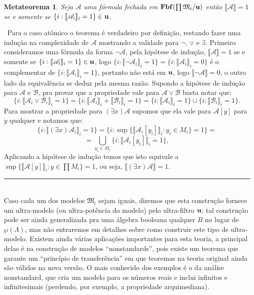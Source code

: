 \documentclass[11pt,a4paper]{article}
\newtheorem{mthrm}[mydef]{Metateorema}
\def\dem{\par\smallbreak\noindent {\textit{ Demonstração:}} \ }
\def\eop{\hfill\rule{2.5mm}{2.5mm} \\ }
\theoremstyle{definition}
\begin{document}
\begin{mthrm}
	
	Seja $\mathscr{A}$ uma fórmula fechada em $\textrm{\textbf{Fbf}}(\prod \mathfrak{M}_i/\bf{u})$ então $ \llbracket \mathscr{A} \rrbracket=1$ se e somente se $\{i: \llbracket \mathscr{A}_i \rrbracket_i=1\}\in \bf{u}$.
	
\end{mthrm}

\dem Para o caso atômico o teorema é verdadeiro por definição, restando fazer uma indução na complexidade de $\mathscr{A}$ mostrando a validade para $\neg$, $\vee$ e $\exists$. Primeiro consideramos uma fórmula da forma $\neg \mathscr{A}$, pela hipótese de indução, $ \llbracket \mathscr{A} \rrbracket=1$ se e somente se $\{i: \llbracket \mathscr{A}_i \rrbracket_i=1\}\in \bf{u}$, logo $\{i: \llbracket \neg \mathscr{A}_i \rrbracket_i=1\}=\{i: \llbracket \mathscr{A}_i \rrbracket_i=0\}$ é o complementar de  $\{i: \llbracket \mathscr{A}_i \rrbracket_i=1\}$, portanto não está em  $\bf{u}$, logo $ \llbracket \neg \mathscr{A} \rrbracket=0$, o outro lado da equivalência se deduz pela mesma razão. Supondo a hipótese de indução para $ \mathscr{A}$ e $ \mathscr{B}$, pra provar que a propriedade vale para $\mathscr{A} \vee \mathscr{B}$ basta notar que: $$\{i: \llbracket \mathscr{A}_i \vee \mathscr{B}_i \rrbracket_i=1\}=\{i: \llbracket \mathscr{A}_i \rrbracket_i + \llbracket \mathscr{B}_i \rrbracket_i=1\}=\{i: \llbracket \mathscr{A}_i \rrbracket_i =1\} \cup  \{ i: \llbracket \mathscr{B}_i \rrbracket_i=1\}.$$ Para mostrar a propriedade para $(\exists x)\mathscr{A}$ supomos que ela vale para $\mathscr{A}[y]$ para $y$ qualquer e notamos que: $$\{i: \llbracket (\exists x)\mathscr{A}_i \rrbracket_i=1\}= \{i:\sup \{ \llbracket \mathscr{A}_i[y_i] \rrbracket_i:y_i\in M_i\}=1\}=$$ $$=\bigcup_{y_i\in M_i} \{i: \llbracket \mathscr{A}_i[y_i] \rrbracket_i=1\},$$ Aplicando a hipótese de indução temos que isto equivale a $\sup \{ \llbracket \mathscr{A}[y] \rrbracket_i:y\in \prod M_i\}=1$, ou seja, $ \llbracket (\exists x)\mathscr{A}  \rrbracket = 1$. \eop

Caso cada um dos modelos $\mathfrak{M}_i$ sejam iguais, dizemos que esta construção fornece um ultra-modelo (ou ultra-potência do modelo) pelo ultra-filtro $\bf{u}$; tal construção pode ser ainda generalizada pra uma álgebra booleana qualquer $B$ no lugar de $\wp(\Lambda)$, mas não entraremos em detalhes sobre como construir este tipo de ultra-modelo. Existem ainda várias aplicações importantes para esta teoria, a principal delas é na construção de modelos ``nonstandards'', pois existe um teorema que garante um ``princípio de transferência'' em que teoremas na teoria original ainda são válidos na nova versão. O mais conhecido dos exemplos é o da análise nonstandard, que cria um modelo para os números reais e inclui infinitos e infinitesimais (perdendo, por exemplo, a propriedade arquimediana). 
\end{document}
